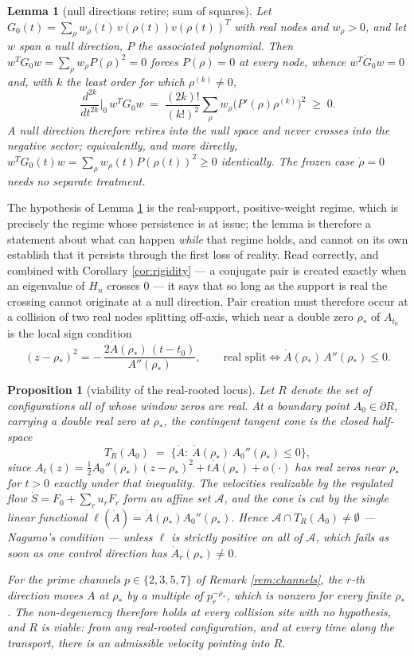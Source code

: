 \documentclass[11pt]{article}
\theoremstyle{plain}
\newtheorem{lemma}[theorem]{Lemma}
\newtheorem{proposition}[theorem]{Proposition}
\theoremstyle{definition}
\theoremstyle{remark}
\begin{document}
\begin{lemma}[null directions retire; sum of squares]\label{lem:retire}
Let $G_0(t)=\sum_\rho w_\rho(t)\,v(\rho(t))v(\rho(t))^{T}$ with real nodes and
$w_\rho>0$, and let $w$ span a null direction, $P$ the associated polynomial.
Then $w^{T}G_0w=\sum_\rho w_\rho P(\rho)^2=0$ forces $P(\rho)=0$ at every node,
whence $w^{T}\dot G_0w=0$ and, with $k$ the least order for which
$\rho^{(k)}\ne0$,
\[
  \frac{d^{2k}}{dt^{2k}}\Big|_{0}\,w^{T}G_0w
  \;=\;\frac{(2k)!}{(k!)^2}\sum_\rho w_\rho\bigl(P'(\rho)\rho^{(k)}\bigr)^{2}
  \;\ge\;0 .
\]
A null direction therefore retires into the null space and never crosses into
the negative sector; equivalently, and more directly,
$w^{T}G_0(t)w=\sum_\rho w_\rho(t)P(\rho(t))^2\ge0$ identically. The frozen case
$\dot\rho=0$ needs no separate treatment.
\end{lemma}

\noindent The hypothesis of Lemma \ref{lem:retire} is the real-support,
positive-weight regime, which is precisely the regime whose persistence is at
issue; the lemma is therefore a statement about what can happen \emph{while}
that regime holds, and cannot on its own establish that it persists through the
first loss of reality. Read correctly, and combined with Corollary
\ref{cor:rigidity} --- a conjugate pair is created exactly when an eigenvalue of
$H_n$ crosses $0$ --- it says that so long as the support is real the crossing
cannot originate at a null direction. Pair creation must therefore occur at a
collision of two real nodes splitting off-axis, which near a double zero
$\rho_*$ of $A_{t_0}$ is the local sign condition
\[
  (z-\rho_*)^2=-\,\frac{2\dot A(\rho_*)\,(t-t_0)}{A''(\rho_*)},
  \qquad\text{real split}\iff \dot A(\rho_*)\,A''(\rho_*)\le0 .
\]

\begin{proposition}[viability of the real-rooted locus]\label{prop:viability}
Let $R$ denote the set of configurations all of whose window zeros are real.
At a boundary point $A_0\in\partial R$, carrying a double real zero at
$\rho_*$, the contingent tangent cone is the closed half-space
\[
  T_R(A_0)\;=\;\bigl\{\dot A:\ \dot A(\rho_*)\,A_0''(\rho_*)\le0\bigr\},
\]
since $A_t(z)=\tfrac12A_0''(\rho_*)(z-\rho_*)^2+t\dot A(\rho_*)+o(\cdot)$ has
real zeros near $\rho_*$ for $t>0$ exactly under that inequality. The
velocities realizable by the regulated flow $\dot S=F_0+\sum_ru_rF_r$ form an
affine set $\mathcal A$, and the cone is cut by the single linear functional
$\ell(\dot A)=\dot A(\rho_*)A_0''(\rho_*)$. Hence
$\mathcal A\cap T_R(A_0)\ne\emptyset$ --- Nagumo's condition --- unless $\ell$
is strictly positive on all of $\mathcal A$, which fails as soon as one control
direction has $\dot A_r(\rho_*)\ne0$.

For the prime channels $p\in\{2,3,5,7\}$ of Remark \ref{rem:channels}, the
$r$-th direction moves $A$ at $\rho_*$ by a multiple of $p_r^{-\rho_*}$, which
is nonzero for every finite $\rho_*$. The non-degeneracy therefore holds at
every collision site with no hypothesis, and $R$ is viable: from any
real-rooted configuration, and at every time along the transport, there is an
admissible velocity pointing into $R$.
\end{proposition}
\end{document}
